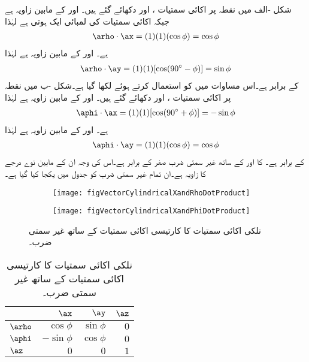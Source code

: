 شکل -الف میں نقطہ  پر اکائی سمتیات ،  اور  دکھائے گئے ہیں۔ اور   کے مابین زاویہ  ہے جبکہ اکائی سمتیات کی لمبائی ایک ہوتی ہے لہٰذا
\begin{align}
\arho \cdot \ax=(1)(1)(\cos \phi)=\cos \phi
\end{align}
ہے۔ اور   کے مابین زاویہ  ہے  لہٰذا
\begin{align}
\arho \cdot \ay=(1)(1)[\cos (90^\circ-\phi)]=\sin \phi
\end{align}
کے برابر ہے۔اس مساوات میں  کو استعمال کرتے ہوئے  لکھا گیا ہے۔شکل -ب میں نقطہ  پر اکائی سمتیات ،  اور  دکھائے گئے ہیں۔ اور   کے مابین زاویہ  ہے  لہٰذا
\begin{align}
\aphi \cdot \ax=(1)(1)[\cos (90^\circ+\phi)]=-\sin \phi
\end{align}
ہے۔ اور   کے مابین زاویہ  ہے  لہٰذا
\begin{align}
\aphi \cdot \ay=(1)(1)(\cos \phi)=\cos \phi
\end{align}
کے برابر ہے۔ کا  اور  کے ساتھ غیر سمتی ضرب صفر کے برابر ہے۔اس کی وجہ ان کے مابین نوے درجے کا زاویہ ہے۔ان تمام غیر سمتی ضرب کو جدول  میں یکجا کیا گیا ہے۔
\begin{figure}
\centering
\begin{subfigure}{0.4\textwidth}
\centering
\texttt{[image: figVectorCylindricalXandRhoDotProduct]}
\end{subfigure}%
%
\begin{subfigure}{0.4\textwidth}
\centering
\texttt{[image: figVectorCylindricalXandPhiDotProduct]}
\end{subfigure}%
\caption{نلکی اکائی سمتیات کا کارتیسی اکائی سمتیات کے ساتھ غیر سمتی ضرب۔}
\label{شکل_سمتیہ_نلکی_کارتیسی_اکائی_غیر_سمتی_ضرب}
\end{figure}%
%
%
\begin{table}
\caption{نلکی اکائی سمتیات کا کارتیسی اکائی سمتیات کے ساتھ غیر سمتی ضرب۔}
\centering
\begin{tabular}{l | r r r}
 & $\ax$ & $\ay$ & $\az$ \\
\hline
$\arho$ & $\cos \phi$ & $\sin \phi $& $0$\\
$\aphi$ &$-\sin \phi$ &$ \cos \phi$ &$ 0$\\
$\az$ & $0$ &$ 0$ &$1$
\end{tabular}
\label{جدول_سمتیہ_نلکی_کارتیسی_اکائی_غیر-سمتی_ضرب}
\end{table}
